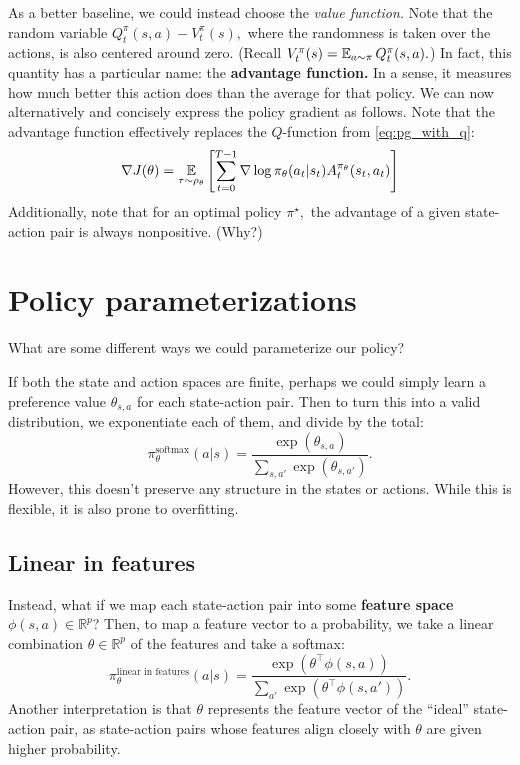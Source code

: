 \documentclass[../main/main]{subfiles}
\begin{document}
As a better baseline, we could instead choose the \emph{value function.} Note that the random variable $Q^\pi_t(s, a) - V^\pi_t(s),$ where the randomness is taken over the actions,
is also centered around zero. (Recall $V^\pi_t(s) = \operatorname*{\mathbb{E}}_{a \sim \pi} Q^\pi_t(s, a).$) In fact, this quantity has a particular name: the \textbf{advantage function.} In a sense, it measures how much better this action does than the average for that policy.
We can now alternatively and concisely express the policy gradient as follows. Note that the advantage function effectively replaces the $Q$-function from \autoref{eq:pg_with_q}: \[
    \nabla J(\theta) = \operatorname*{\mathbb{E}}_{\tau \sim \rho_\theta} \left[
        \sum_{t=0}^{T-1} \nabla \log \pi_\theta(a_t | s_t) A^{\pi_\theta}_t (s_t, a_t)
    \right]
\]
Additionally, note that for an optimal policy $\pi^\star,$ the advantage of a given state-action pair is always nonpositive. (Why?)


\section{Policy parameterizations} \label{sec:parameterizations}

What are some different ways we could parameterize our policy?

If both the state and action spaces are finite, perhaps we could simply learn a preference value $\theta_{s,a}$ for each state-action pair. Then to turn this into a valid distribution, we exponentiate each of them, and divide by the total: \[
    \pi^\text{softmax}_\theta(a | s) = \frac{\exp(\theta_{s,a})}{\sum_{s,a'} \exp (\theta_{s,a'})}.
\]
However, this doesn't preserve any structure in the states or actions. While this is flexible, it is also prone to overfitting.

\subsection{Linear in features}

Instead, what if we map each state-action pair into some \textbf{feature space} $\phi(s, a) \in \mathbb{R}^p$? Then, to map a feature vector to a probability,
we take a linear combination $\theta \in \mathbb{R}^p$ of the features and take a softmax: \[
    \pi^\text{linear in features}_{\theta}(a|s) = \frac{\exp(\theta^\top \phi(s, a))}{\sum_{a'} \exp(\theta^\top \phi(s, a'))}.
\]
Another interpretation is that $\theta$ represents the feature vector of the ``ideal'' state-action pair, as state-action pairs whose features align closely with $\theta$ are given higher probability.
\end{document}
